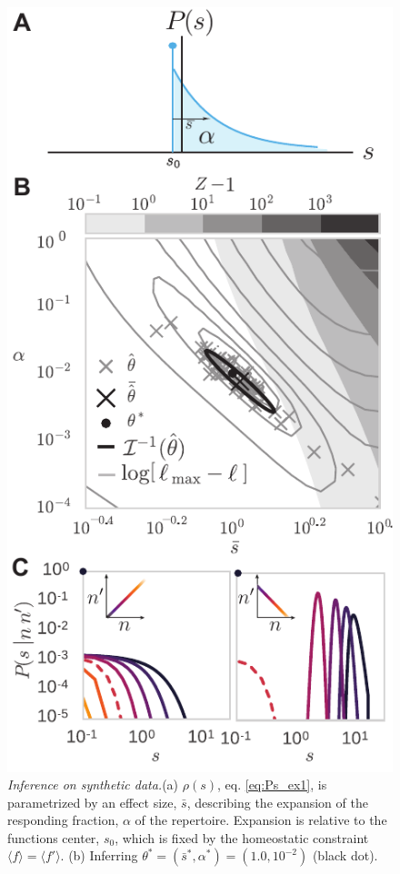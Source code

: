 \documentclass[letterpaper,english,prl,reprint,longbibliography]{revtex4-1} %
\begin{document}
\begin{figure}[tbph!]
\includegraphics{fig5_diffexpr_eval}
\centering{}
\caption{
\emph{Inference on synthetic data.}(a) $\rho(s)$, eq. \ref{eq:Ps_ex1}, is parametrized by an effect size, $\bar{s}$, describing the expansion of the responding fraction, $\alpha$ of the repertoire. 
Expansion is relative to the functions center, $s_0$, which is fixed by the homeostatic constraint $\langle f \rangle=\langle f' \rangle$.
(b) Inferring $\theta^*=(\bar{s}^*,\alpha^* )=(1.0,10^{-2})$ (black dot). 
}
\end{figure}
\end{document}
